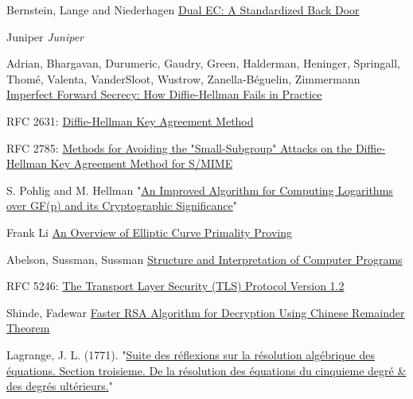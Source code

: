 \documentclass[a4paper,11pt,twocolumn]{article}
\begin{document}
\begin{thebibliography}{1}

 Bernstein, Lange and Niederhagen \href{https://eprint.iacr.org/2015/767.pdf}{Dual EC: A Standardized Back Door}

 Juniper {\em Juniper}

 Adrian, Bhargavan, Durumeric, Gaudry, Green, Halderman, Heninger, Springall, Thomé, Valenta,  VanderSloot, Wustrow, Zanella-Béguelin, Zimmermann \href{https://weakdh.org/imperfect-forward-secrecy-ccs15.pdf}{Imperfect Forward Secrecy: How Diffie-Hellman Fails in Practice}

 RFC 2631: \href{https://tools.ietf.org/html/rfc2631}{Diffie-Hellman Key Agreement Method}

 RFC 2785: \href{https://tools.ietf.org/html/rfc2785}{Methods for Avoiding the "Small-Subgroup" Attacks on the Diffie-Hellman Key Agreement Method for S/MIME}

 S. Pohlig and M. Hellman "\href{http://www-ee.stanford.edu/~hellman/publications/28.pdf}{An Improved Algorithm for Computing Logarithms over GF(p) and its Cryptographic Significance}"

 Frank Li \href{http://theory.stanford.edu/~dfreeman/cs259c-f11/finalpapers/primalityproving.pdf}{An Overview of Elliptic Curve Primality Proving}

 Abelson, Sussman, Sussman \href{https://mitpress.mit.edu/sicp/chapter1/footnode.html#2413}{Structure and Interpretation of Computer Programs}

 RFC 5246: \href{https://www.ietf.org/rfc/rfc5246.txt}{The Transport Layer Security (TLS) Protocol Version 1.2}

 Shinde, Fadewar \href{http://www.techscience.com/doi/10.3970/icces.2008.005.255.pdf}{Faster RSA Algorithm for Decryption Using Chinese
Remainder Theorem}

 Lagrange, J. L. (1771). "\href{https://books.google.com/books?id=_-U_AAAAYAAJ&pg=PA138#v=onepage&q&f=false}{Suite des réflexions sur la résolution algébrique des équations. Section troisieme. De la résolution des équations du cinquieme degré & des degrés ultérieurs.}"

\end{thebibliography}
\end{document}
